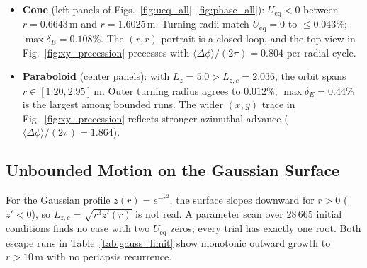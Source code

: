 \documentclass[11pt,letterpaper]{article}
\begin{document}
\begin{summarybox}
\begin{itemize}[leftmargin=1.5em, itemsep=0.45em, topsep=0.2em]
    \item \textbf{Cone} (left panels of Figs.~\ref{fig:ueq_all}--\ref{fig:phase_all}): $U_{\mathrm{eq}}<0$ between $r=0.6643\,\mathrm{m}$ and $r=1.6025\,\mathrm{m}$. Turning radii match $U_{\mathrm{eq}}=0$ to $\le 0.043\%$; $\max\delta_E=0.108\%$. The $(r,\dot{r})$ portrait is a closed loop, and the top view in Fig.~\ref{fig:xy_precession} precesses with $\langle\Delta\phi\rangle/(2\pi)=0.804$ per radial cycle.
    \item \textbf{Paraboloid} (center panels): with $L_z=5.0>L_{z,c}=2.036$, the orbit spans $r\in[1.20,2.95]\,\mathrm{m}$. Outer turning radius agrees to $0.012\%$; $\max\delta_E=0.44\%$ is the largest among bounded runs. The wider $(x,y)$ trace in Fig.~\ref{fig:xy_precession} reflects stronger azimuthal advance ($\langle\Delta\phi\rangle/(2\pi)=1.864$).
\end{itemize}
\end{summarybox}

\subsection{Unbounded Motion on the Gaussian Surface}
\label{sec:limit_escape}

For the Gaussian profile $z(r)=e^{-r^2}$, the surface slopes downward for $r>0$ ($z'<0$), so $L_{z,c}=\sqrt{r^3 z'(r)}$ is not real. A parameter scan over 28\,665 initial conditions finds no case with two $U_{\mathrm{eq}}$ zeros; every trial has exactly one root. Both escape runs in Table~\ref{tab:gauss_limit} show monotonic outward growth to $r>10\,\mathrm{m}$ with no periapsis recurrence.
\end{document}
